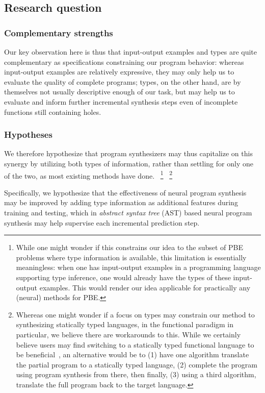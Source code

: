\documentclass{article}
\begin{document}
\subsection{Research question}

\subsubsection{Complementary strengths}

Our key observation here is thus that input-output examples and types are quite complementary as specifications constraining our program behavior:
whereas input-output examples are relatively expressive, they may only help us to evaluate the quality of complete programs;
types, on the other hand, are by themselves not usually descriptive enough of our task,
but may help us to evaluate and inform further incremental synthesis steps even of incomplete functions still containing holes.

\subsubsection{Hypotheses}

We therefore hypothesize that program synthesizers may thus capitalize on this synergy by utilizing both types of information,
rather than settling for only one of the two, as most existing methods have done.%
~\footnote{
    While one might wonder if this constrains our idea to the subset of PBE problems where type information is available,
    this limitation is essentially meaningless:
    when one has input-output examples in a programming language supporting type inference,
    one would already have the types of these input-output examples.
    This would render our idea applicable for practically any (neural) methods for PBE.
}%
~\footnote{
    Whereas one might wonder if a focus on types may constrain our method to synthesizing statically typed languages,
    in the functional paradigm in particular, we believe there are workarounds to this.
    While we certainly believe users may find switching to a statically typed functional language to be beneficial~\citep{hughes1989functional},
    an alternative would be to (1) have one algorithm translate the partial program to a statically typed language,
    (2) complete the program using program synthesis from there,
    then finally, (3) using a third algorithm, translate the full program back to the target language.
}

Specifically, we hypothesize that the effectiveness of neural program synthesis may be improved by
adding type information as additional features during training and testing,
which in \emph{abstract syntax tree} (AST) based neural program synthesis may help supervise each incremental prediction step.
\end{document}
